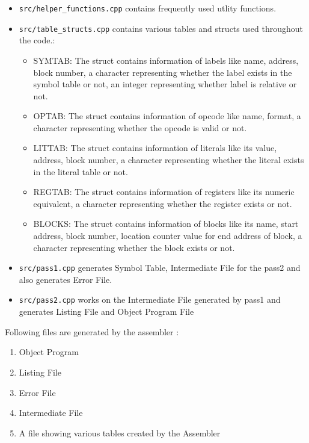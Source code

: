 \documentclass[
]{article}
\begin{document}
\begin{itemize}
\item
  \texttt{src/helper\_functions.cpp} contains frequently used utlity
  functions.
\item
  \texttt{src/table\_structs.cpp} contains various tables and structs
  used throughout the code.:

\begin{itemize}
\item 
SYMTAB: The struct contains information of labels like name, address, block number, a character 
representing whether the label exists in the symbol table or not, an integer representing 
whether label is relative or not.

\item 
OPTAB: The struct contains information of opcode like name, format, a character representing 
whether the opcode is valid or not.

\item
LITTAB: The struct contains information of literals like its value, address, block number, a character 
representing whether the literal exists in the literal table or not.

\item 
REGTAB: The struct contains information of registers like its numeric equivalent, a character 
representing whether the register exists or not.

\item
BLOCKS: The struct contains information of blocks like its name, start address, block number, location 
counter value for end address of block, a character representing whether the block exists or not.

\end{itemize}
\end{itemize}


\begin{itemize}
\item
  \texttt{src/pass1.cpp} generates Symbol Table, Intermediate File for
  the pass2 and also generates Error File.
\item
  \texttt{src/pass2.cpp} works on the Intermediate File generated by
  pass1 and generates Listing File and Object Program File
\end{itemize}

Following files are generated by the assembler :
\begin{enumerate}
\def\labelenumi{\arabic{enumi})}
\item
Object Program 
\item 
Listing File 
\item
Error File
\item
Intermediate File
\item
A file showing various tables created by the Assembler
\end{enumerate}
\end{document}
